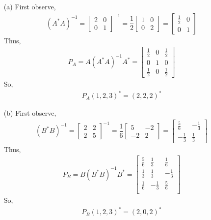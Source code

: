 \documentclass[10pt]{article}
\begin{document}
\begin{solution}[Solution]
    \begin{enumerate}
    \item[(a)] 
        First observe,
        \begin{align*}
            (A^*A)^{-1} = \left[\begin{array}{cc}2 & 0\\0 & 1\end{array}\right]^{-1} = \dfrac{1}{2}\left[\begin{array}{cc}1 & 0 \\ 0 & 2\end{array}\right] = \left[\begin{array}{cc}\frac{1}{2} & 0\\0 & 1\end{array}\right]
        \end{align*}
        Thus,
        \begin{align*}
            P_A = A(A^*A)^{-1}A^* = \left[\begin{array}{ccc}\frac{1}{2} & 0 & \frac{1}{2} \\ 0 & 1 & 0 \\ \frac{1}{2} & 0 & \frac{1}{2} \end{array}\right] 
        \end{align*}
        So,
        \begin{align*}
            P_A(1,2,3)^* = (2,2,2)^*
        \end{align*}
    \item[(b)]
        First observe,
        \begin{align*}
            (B^*B)^{-1} =  \left[\begin{array}{ccc} 2 & 2 \\ 2 & 5\end{array}\right]^{-1} = \dfrac{1}{6}\left[\begin{array}{cc}5 & -2\\-2 & 2\end{array}\right] = \left[\begin{array}{cc}\frac{5}{6} & -\frac{1}{3} \\ -\frac{1}{3} & \frac{1}{3}\end{array}\right]
       \end{align*}
        Thus,
        \begin{align*}
            P_B = B(B^*B)^{-1}B^* = \left[\begin{array}{ccc} \frac{5}{6} & \frac{1}{3} & \frac{1}{6} \\ \frac{1}{3} & \frac{1}{3} & -\frac{1}{3} \\ \frac{1}{6} & -\frac{1}{3} & \frac{5}{6} \\\end{array} \right]
        \end{align*}
        So,
        \begin{align*}
            P_B(1,2,3)^* = (2,0,2)^*
        \end{align*}
    \end{enumerate}
\end{solution}
\end{document}
